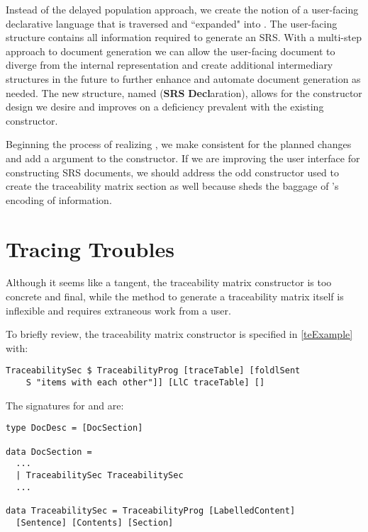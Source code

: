 Instead of the delayed population approach, we create the notion of a user-facing declarative language that is traversed and ``expanded" into . The user-facing structure contains all information required to generate an SRS. With a multi-step approach to document generation we can allow the user-facing document to diverge from the internal representation and create additional intermediary structures in the future to further enhance and automate document generation as needed. The new structure, named  (\textbf{SRS} \textbf{Decl}aration), allows for the constructor design we desire and improves on a deficiency prevalent with the existing  constructor.

Beginning the process of realizing , we make  consistent for the planned changes and add a \haskell{[ConceptInstance]} argument to the  constructor. If we are improving the user interface for constructing SRS documents, we should address the odd  constructor used to create the traceability matrix section as well because  sheds the baggage of 's encoding of information.

\section{Tracing Troubles}\label{dlTraceMat}
Although it seems like a tangent, the traceability matrix  constructor is too concrete and final, while the method to generate a traceability matrix itself is inflexible and requires extraneous work from a user.

To briefly review, the traceability matrix constructor is specified in \autoref{teExample} with:

\begin{tcolorbox}
\begin{verbatim}
TraceabilitySec $ TraceabilityProg [traceTable] [foldlSent
    S "items with each other"]] [LlC traceTable] []
\end{verbatim}
\end{tcolorbox}

The signatures for  and  are:

\begin{tcolorbox}
\begin{verbatim}
type DocDesc = [DocSection]

data DocSection =
  ...
  | TraceabilitySec TraceabilitySec
  ...

data TraceabilitySec = TraceabilityProg [LabelledContent]
  [Sentence] [Contents] [Section]
\end{verbatim}
\end{tcolorbox}

